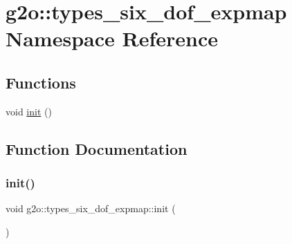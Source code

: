 \hypertarget{namespaceg2o_1_1types__six__dof__expmap}{}\section{g2o\+:\+:types\+\_\+six\+\_\+dof\+\_\+expmap Namespace Reference}
\label{namespaceg2o_1_1types__six__dof__expmap}
\subsection*{Functions}
\begin{DoxyCompactItemize}
\item 
void \mbox{\hyperlink{namespaceg2o_1_1types__six__dof__expmap_a2bec58737fccd3c11536ce1eb2692b73}{init}} ()
\end{DoxyCompactItemize}


\subsection{Function Documentation}
\mbox{\label{namespaceg2o_1_1types__six__dof__expmap_a2bec58737fccd3c11536ce1eb2692b73}} 
\subsubsection{\texorpdfstring{init()}{init()}}
{\footnotesize\ttfamily void g2o\+::types\+\_\+six\+\_\+dof\+\_\+expmap\+::init (\begin{DoxyParamCaption}{ }\end{DoxyParamCaption})}

